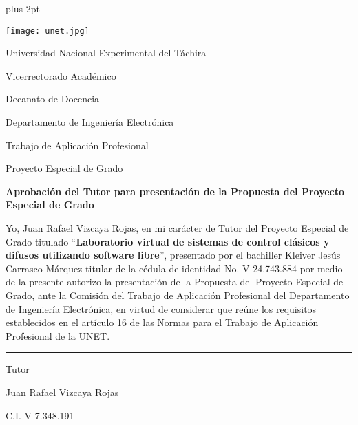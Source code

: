 \begin{titlepage}
\parskip=7.25pt plus 2pt
\setcounter{page}{4}
\begin{center}
	\begin{spacing}{1.5}
	\texttt{[image: unet.jpg]}
	
	Universidad Nacional Experimental del Táchira 
	
	Vicerrectorado Académico
	
	Decanato de Docencia
	
	Departamento de Ingeniería Electrónica
	
	Trabajo de Aplicación Profesional
	
	Proyecto Especial de Grado
	\end{spacing}
\end{center}

\vspace{0.5cm}

\begin{center}
		
		\textbf{Aprobación del Tutor para presentación de la Propuesta del Proyecto Especial de Grado}
		
\end{center}

\vspace{0.5cm}

\begin{spacing}{1.5}
	Yo, Juan Rafael Vizcaya Rojas, en mi carácter de Tutor del Proyecto Especial de Grado titulado \enquote{\textbf{Laboratorio virtual de sistemas de control clásicos y difusos utilizando software libre}}, presentado por el bachiller Kleiver Jesús Carrasco Márquez titular de la cédula de identidad No. \mbox{V-24.743.884} por medio de la presente autorizo la presentación de la Propuesta del Proyecto Especial de Grado, ante la Comisión del Trabajo de Aplicación Profesional del Departamento de Ingeniería Electrónica, en virtud de considerar que reúne los requisitos establecidos en el artículo 16 de las Normas para el Trabajo de Aplicación Profesional de la UNET.
\end{spacing}

\vfill

\begin{center}
	
	\rule{6cm}{1pt}
	
	\vspace{0.2cm}
	
	Tutor
	
	Juan Rafael Vizcaya Rojas
	
	\setlength{\parskip}{0pt}
	
	C.I. V-7.348.191
\end{center}

\vspace{0.5cm}
\end{titlepage}